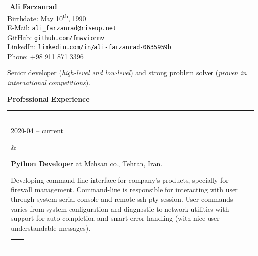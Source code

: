 \documentclass[11pt,a4paper,oneside]{article}
\makeatletter
\newcommand{\https}[1]{\href{https://#1}{\nolinkurl{#1}}}
\newcommand{\mailto}[1]{\href{mailto://#1}{\nolinkurl{#1}}}
\newcommand{\prog}{Programming Lang.:}
\newcommand{\os}{Operating System:}
\newcommand{\vcs}{Version Controls:}
\newcommand{\issue}{Issue Tracking:}
\renewcommand{\section}[1]{%
{\large\textbf{#1}}\\
\rule[9pt]{18cm}{.4pt}\vspace{-16pt}%
}
\newenvironment{mytable}{%
\begin{tabular}{@{}l@{\hspace{4mm}}l@{}}%
}{\end{tabular}}
\newcommand{\myitem}[2]{%
\parbox[t]{16mm}{#1}&\parbox[t]{16cm}{#2}\\%
}
\newenvironment{innertable}{%
\begin{tabular}{@{}l@{\hspace{5mm}}l@{}}%
}{\end{tabular}}
\newcommand{\inneritem}[2]{%
\parbox{35mm}{{\color{darkgray}#1}}&\parbox{12cm}{#2}\\%
}
\makeatother
\begin{document}
%
%
\hspace{1cm}%
\parbox{13cm}{%
\begin{tabbing}%
\hspace{3cm}\=\kill%
\textbf{{\LARGE Ali Farzanrad}}\\[5mm]
Birthdate: \>
May 10\textsuperscript{th}, 1990\\[1mm]
E-Mail: \>
\mailto{ali_farzanrad@riseup.net}\\[1mm]
GitHub: \>
\https{github.com/fmwviormv}\\[1mm]
LinkedIn: \>
\https{linkedin.com/in/ali-farzanrad-0635959b}\\[1mm]
Phone: \>
+98{ }911{ }871{ }3396\\
\end{tabbing}%
}

\vspace{-9pt}%
Senior developer (\textit{high-level and low-level}) and strong
problem solver (\textit{proven in international competitions}).

\section{Professional Experience}

\begin{mytable}
\myitem{2020-04 -- current}{%
\textbf{Python Developer} at
Mahsan co., Tehran, Iran.

Developing command-line interface for company's products,
specially for firewall management.
Command-line is responsible for interacting with user through
system serial console and remote ssh pty session.
User commands varies from system configuration and diagnostic
to network utilities with support for auto-completion and
smart error handling (with nice user understandable messages).

\begin{innertable}
\inneritem{\prog}{Python 3, and Shell script}
\inneritem{\os}{Ubuntu}
\inneritem{\vcs}{Git}
\inneritem{\issue}{Gitlab}
\end{innertable}
}
\end{mytable}
\end{document}
